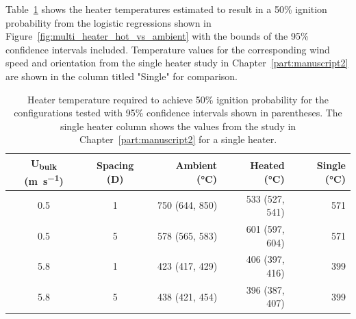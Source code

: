     Table~\ref{tab:multiFiftyTemp} shows the heater temperatures estimated to result in a 50\% ignition probability from the logistic regressions shown in Figure~\ref{fig:multi_heater_hot_vs_ambient} with the bounds of the 95\% confidence intervals included. Temperature values for the corresponding wind speed and orientation from the single heater study in Chapter~\ref{part:manuscript2} are shown in the column titled "Single" for comparison. 
        \begin{table}[hpbt]
            \normalsize
            \caption{Heater temperature required to achieve 50\% ignition probability for the configurations tested with 95\% confidence intervals shown in parentheses. The single heater column shows the values from the study in Chapter~\ref{part:manuscript2} for a single heater.}
            \centering
            \begin{tabular}{ccrrr}
                \rowcolor{gray!50}
               U\textsubscript{bulk} (\si{\meter\per\second}) & Spacing (D) & Ambient (\si{\celsius})& Heated (\si{\celsius}) & Single (\si{\celsius})\\
                \hline
                0.5  & 1 & 750 (644, 850) & 533 (527, 541) & 571\\
                0.5  & 5 & 578 (565, 583) & 601 (597, 604) & 571\\
                5.8  & 1 & 423 (417, 429) & 406 (397, 416) & 399\\
                5.8  & 5 & 438 (421, 454) & 396 (387, 407) & 399
            \end{tabular}
            \label{tab:multiFiftyTemp}
        \end{table}
        
